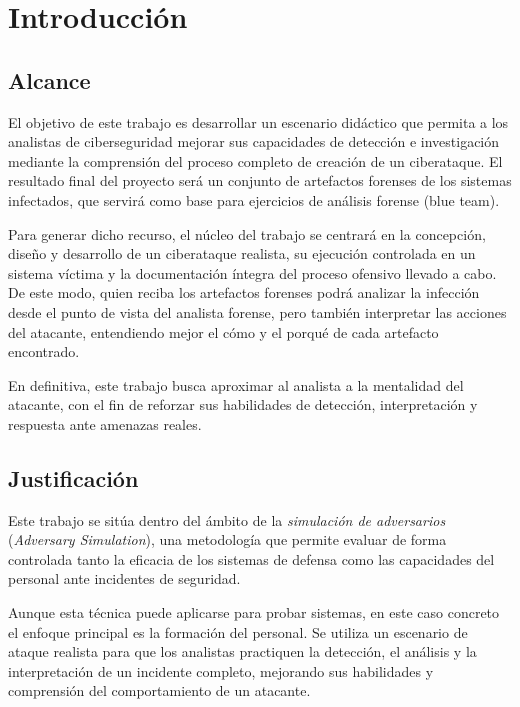 

\chapter{Introducción}

\section{Alcance}

El objetivo de este trabajo es desarrollar un escenario didáctico que permita a los analistas de ciberseguridad mejorar sus capacidades de detección e investigación mediante la comprensión del proceso completo de creación de un ciberataque. El resultado final del proyecto será un conjunto de artefactos forenses de los sistemas infectados, que servirá como base para ejercicios de análisis forense (blue team).

Para generar dicho recurso, el núcleo del trabajo se centrará en la concepción, diseño y desarrollo de un ciberataque realista, su ejecución controlada en un sistema víctima y la documentación íntegra del proceso ofensivo llevado a cabo. De este modo, quien reciba los artefactos forenses podrá analizar la infección desde el punto de vista del analista forense, pero también interpretar las acciones del atacante, entendiendo mejor el cómo y el porqué de cada artefacto encontrado.

En definitiva, este trabajo busca aproximar al analista a la mentalidad del atacante, con el fin de reforzar sus habilidades de detección, interpretación y respuesta ante amenazas reales.

\section{Justificación}

Este trabajo se sitúa dentro del ámbito de la \textit{simulación de adversarios} (\textit{Adversary Simulation}), una metodología que permite evaluar de forma controlada tanto la eficacia de los sistemas de defensa como las capacidades del personal ante incidentes de seguridad. 

Aunque esta técnica puede aplicarse para probar sistemas, en este caso concreto el enfoque principal es la formación del personal. Se utiliza un escenario de ataque realista para que los analistas practiquen la detección, el análisis y la interpretación de un incidente completo, mejorando sus habilidades y comprensión del comportamiento de un atacante.

